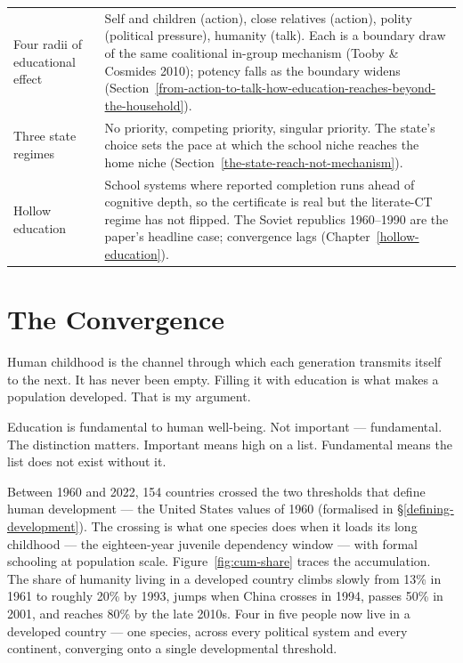 \documentclass[12pt,letterpaper]{article}
\begin{document}
\begin{longtable}{@{}p{}p{}@{}}
Four radii of educational effect &
Self and children (action), close relatives (action), polity
(political pressure), humanity (talk). Each is a boundary draw of
the same coalitional in-group mechanism (Tooby \& Cosmides 2010);
potency falls as the boundary widens
(Section~\ref{from-action-to-talk-how-education-reaches-beyond-the-household}). \\

Three state regimes &
No priority, competing priority, singular priority. The state's
choice sets the pace at which the school niche reaches the home
niche (Section~\ref{the-state-reach-not-mechanism}). \\

Hollow education &
School systems where reported completion runs ahead of cognitive
depth, so the certificate is real but the literate-CT regime has not
flipped. The Soviet republics 1960--1990 are the paper's headline
case; convergence lags
(Chapter~\ref{hollow-education}). \\

\bottomrule
\end{longtable}\addtocounter{table}{-1}%

\newpage

\section{The Convergence}\label{the-convergence}

Human childhood is the channel through which each generation
transmits itself to the next. It has never been empty. Filling it
with education is what makes a population developed. That is my
argument.

Education is fundamental to human well-being. Not important ---
fundamental. The distinction matters. Important means high on a list.
Fundamental means the list does not exist without it.

Between 1960 and 2022, 154 countries crossed the two thresholds
that define human development --- the United States values of 1960
(formalised in \S\ref{defining-development}). The crossing is what
one species does when it loads its long childhood --- the
eighteen-year juvenile dependency window --- with formal schooling at
population scale. Figure~\ref{fig:cum-share} traces the accumulation. The
share of humanity living in a developed country climbs slowly from
13\% in 1961 to roughly 20\% by 1993, jumps when China crosses in
1994, passes 50\% in 2001, and reaches 80\% by the late 2010s. Four
in five people now live in a developed country --- one species,
across every political system and every continent, converging onto a
single developmental threshold.
\end{document}
